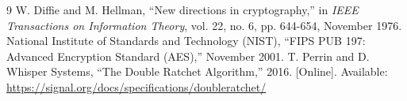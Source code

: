 \documentclass[12pt,a4paper]{article}
\begin{document}
\newpage
\begin{thebibliography}{9}
W. Diffie and M. Hellman, ``New directions in cryptography,'' in \emph{IEEE Transactions on Information Theory}, vol. 22, no. 6, pp. 644-654, November 1976.
National Institute of Standards and Technology (NIST), ``FIPS PUB 197: Advanced Encryption Standard (AES),'' November 2001.
T. Perrin and D. Whisper Systems, ``The Double Ratchet Algorithm,'' 2016. [Online]. Available: \url{https://signal.org/docs/specifications/doubleratchet/}
\end{thebibliography}
\end{document}
